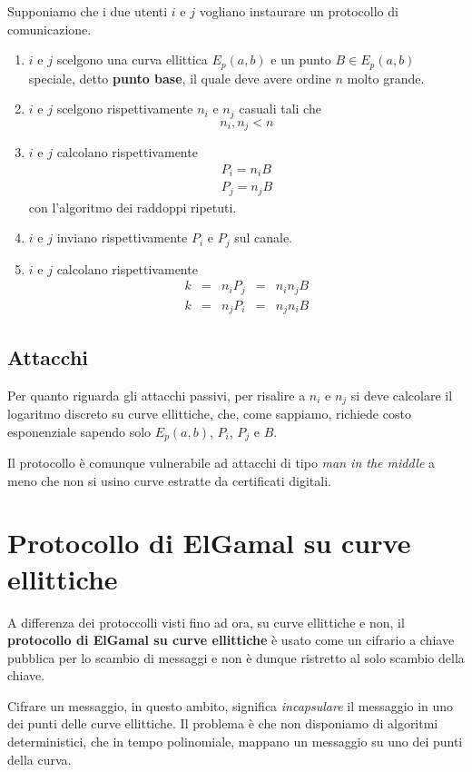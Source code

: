 Supponiamo che i due utenti $i$ e $j$ vogliano instaurare un protocollo di comunicazione.
\begin{enumerate}
	\item $i$ e $j$ scelgono una curva ellittica $E_p(a, b)$ e un punto $B \in E_p(a, b)$ speciale, detto
	      \textbf{punto base}, il quale deve avere ordine $n$ molto grande.
	\item $i$ e $j$ scelgono rispettivamente $n_i$ e $n_j$ casuali tali che
	      \[ n_i, n_j < n \]
	\item $i$ e $j$ calcolano rispettivamente
	      \[
		      \begin{matrix}
			      P_i = n_i B \\
			      P_j = n_j B
		      \end{matrix}
	      \]
	      con l'algoritmo dei raddoppi ripetuti.
	\item $i$ e $j$ inviano rispettivamente $P_i$ e $P_j$ sul canale.
	\item $i$ e $j$ calcolano rispettivamente
	      \[
		      \begin{matrix}
			      k & = & n_i P_j & = & n_i n_j B \\
			      k & = & n_j P_i & = & n_j n_i B
		      \end{matrix}
	      \]
\end{enumerate}

\subsection{Attacchi}
Per quanto riguarda gli attacchi passivi, per risalire a $n_i$ e $n_j$ si deve calcolare il logaritmo discreto
su curve ellittiche, che, come sappiamo, richiede costo esponenziale sapendo solo $E_p(a, b)$, $P_i$, $P_j$ e $B$.

Il protocollo \`e comunque vulnerabile ad attacchi di tipo \emph{man in the middle} a meno che non si usino curve
estratte da certificati digitali.

\section{Protocollo di ElGamal su curve ellittiche}
A differenza dei protoccolli visti fino ad ora, su curve ellittiche e non, il \textbf{protocollo di ElGamal su curve
	ellittiche} \`e usato come un cifrario a chiave pubblica per lo scambio di messaggi e non \`e dunque ristretto
al solo scambio della chiave.

Cifrare un messaggio, in questo ambito, significa \emph{incapsulare} il messaggio in uno dei punti delle curve
ellittiche. Il problema \`e che non disponiamo di algoritmi deterministici, che in tempo polinomiale, mappano
un messaggio su uno dei punti della curva.

